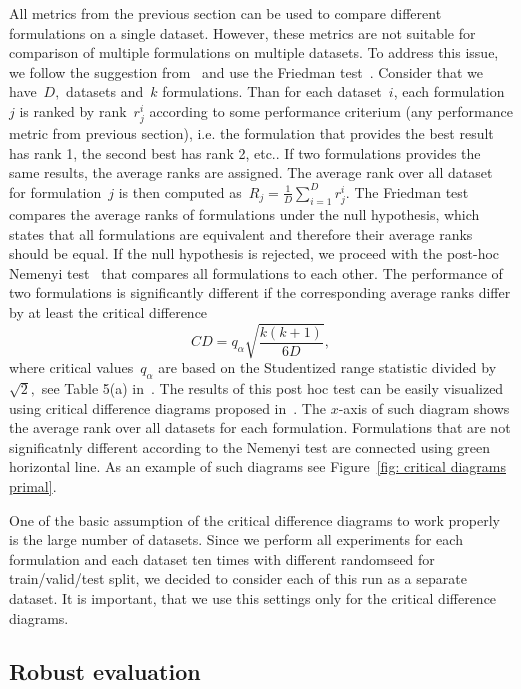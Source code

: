 All metrics from the previous section can be used to compare different formulations on a single dataset. However, these metrics are not suitable for comparison of multiple formulations on multiple datasets. To address this issue, we follow the suggestion from~\cite{demvsar2006statistical} and use the Friedman test~\cite{friedman1940comparison}. Consider that we have~$D,$ datasets and~$k$ formulations. Than for each dataset~$i$, each formulation~$j$ is ranked by rank~$r^i_j$ according to some performance criterium (any performance metric from previous section), i.e. the formulation that provides the best result has rank 1, the second best has rank 2, etc.. If two formulations provides the same results, the average ranks are assigned. The average rank over all dataset for formulation~$j$ is then computed as~$R_j = \frac{1}{D} \sum_{i = 1}^{D} r^{i}_{j}.$ The Friedman test compares the average ranks of formulations under the null hypothesis, which states that all formulations are equivalent and therefore their average ranks should be equal. If the null hypothesis is rejected, we proceed with the post-hoc Nemenyi test~\cite{nemenyi1963distribution} that compares all formulations to each other. The performance of two formulations is significantly different if the corresponding average
ranks differ by at least the critical difference
\begin{equation*}
  CD = q_{\alpha} \sqrt{\frac{k(k + 1)}{6D}},
\end{equation*}
where critical values~$q_{\alpha}$ are based on the Studentized range statistic divided by~$\sqrt{2},$ see Table 5(a) in~\cite{demvsar2006statistical}. The results of this post hoc test can be easily visualized using critical difference diagrams proposed in~\cite{demvsar2006statistical}.  The $x$-axis of such diagram shows the average rank over all datasets for each formulation. Formulations that are not significatnly different according to the Nemenyi test are connected using green horizontal line. As an example of such diagrams see Figure~\ref{fig: critical diagrams primal}.

One of the basic assumption of the critical difference diagrams to work properly is the large number of datasets. Since we perform all experiments for each formulation and each dataset ten times with different randomseed for train/valid/test split, we decided to consider each of this run as a separate dataset. It is important, that we use this settings only for the critical difference diagrams. 

\subsection{Robust evaluation}

